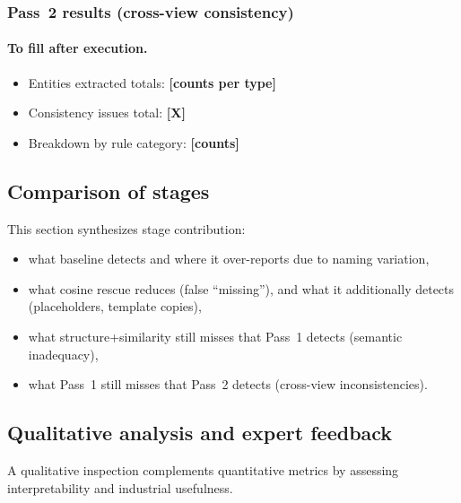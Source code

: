 \subsubsection{Pass~2 results (cross-view consistency)}
\label{sec:eval_pass2_results}

\paragraph{To fill after execution.}
\begin{itemize}
    \item Entities extracted totals: \textbf{[counts per type]}
    \item Consistency issues total: \textbf{[X]}
    \item Breakdown by rule category: \textbf{[counts]}
\end{itemize}

\subsection{Comparison of stages}
\label{sec:eval_stage_comparison}

This section synthesizes stage contribution:
\begin{itemize}
    \item what baseline detects and where it over-reports due to naming variation,
    \item what cosine rescue reduces (false ``missing''), and what it additionally detects (placeholders, template copies),
    \item what structure+similarity still misses that Pass~1 detects (semantic inadequacy),
    \item what Pass~1 still misses that Pass~2 detects (cross-view inconsistencies).
\end{itemize}

\subsection{Qualitative analysis and expert feedback}
\label{sec:eval_qualitative}

A qualitative inspection complements quantitative metrics by assessing interpretability and industrial usefulness.

